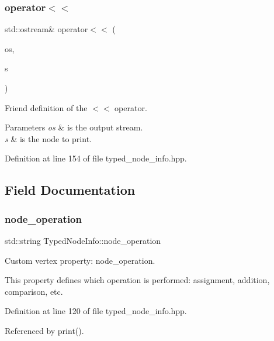\subsubsection{\texorpdfstring{operator$<$$<$}{operator<<}}
{\footnotesize\ttfamily std\+::ostream\& operator$<$$<$ (\begin{DoxyParamCaption}\item[{std\+::ostream \&}]{os,  }\item[{const \hyperlink{structTypedNodeInfo}{Typed\+Node\+Info} \&}]{s }\end{DoxyParamCaption})\hspace{0.3cm}{\ttfamily [friend]}}



Friend definition of the $<$$<$ operator. 


\begin{DoxyParams}{Parameters}
{\em os} & is the output stream. \\
\hline
{\em s} & is the node to print. \\
\hline
\end{DoxyParams}


Definition at line 154 of file typed\+\_\+node\+\_\+info.\+hpp.



\subsection{Field Documentation}
\mbox{\label{structTypedNodeInfo_a92bbce6cb643c1a0b507dc189b9030b4}} 
\subsubsection{\texorpdfstring{node\+\_\+operation}{node\_operation}}
{\footnotesize\ttfamily std\+::string Typed\+Node\+Info\+::node\+\_\+operation}



Custom vertex property\+: node\+\_\+operation. 

This property defines which operation is performed\+: assignment, addition, comparison, etc. 

Definition at line 120 of file typed\+\_\+node\+\_\+info.\+hpp.



Referenced by print().


